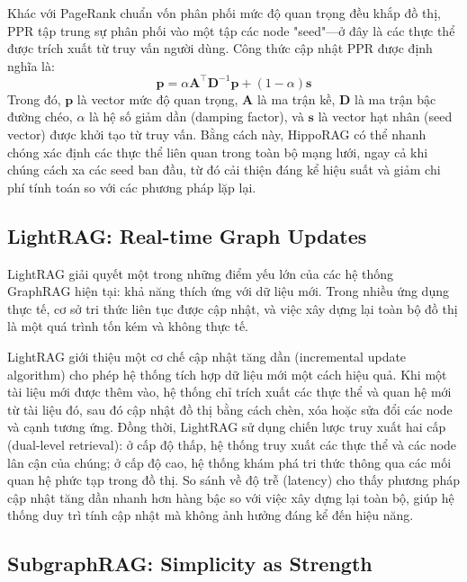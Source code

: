 Khác với PageRank chuẩn vốn phân phối mức độ quan trọng đều khắp đồ thị, PPR tập trung sự phân phối vào một tập các node "seed"—ở đây là các thực thể được trích xuất từ truy vấn người dùng. Công thức cập nhật PPR được định nghĩa là:
\begin{equation}
\mathbf{p} = \alpha \mathbf{A}^\top \mathbf{D}^{-1} \mathbf{p} + (1 - \alpha) \mathbf{s}
\label{eq:hipporag_ppr}
\end{equation}
Trong đó, $\mathbf{p}$ là vector mức độ quan trọng, $\mathbf{A}$ là ma trận kề, $\mathbf{D}$ là ma trận bậc đường chéo, $\alpha$ là hệ số giảm dần (damping factor), và $\mathbf{s}$ là vector hạt nhân (seed vector) được khởi tạo từ truy vấn. Bằng cách này, HippoRAG có thể nhanh chóng xác định các thực thể liên quan trong toàn bộ mạng lưới, ngay cả khi chúng cách xa các seed ban đầu, từ đó cải thiện đáng kể hiệu suất và giảm chi phí tính toán so với các phương pháp lặp lại.

\subsection{LightRAG: Real-time Graph Updates}
\label{subsec:lightrag}

LightRAG \cite{guo2024lightrag} giải quyết một trong những điểm yếu lớn của các hệ thống GraphRAG hiện tại: khả năng thích ứng với dữ liệu mới. Trong nhiều ứng dụng thực tế, cơ sở tri thức liên tục được cập nhật, và việc xây dựng lại toàn bộ đồ thị là một quá trình tốn kém và không thực tế.

LightRAG giới thiệu một cơ chế cập nhật tăng dần (incremental update algorithm) cho phép hệ thống tích hợp dữ liệu mới một cách hiệu quả. Khi một tài liệu mới được thêm vào, hệ thống chỉ trích xuất các thực thể và quan hệ mới từ tài liệu đó, sau đó cập nhật đồ thị bằng cách chèn, xóa hoặc sửa đổi các node và cạnh tương ứng. Đồng thời, LightRAG sử dụng chiến lược truy xuất hai cấp (dual-level retrieval): ở cấp độ thấp, hệ thống truy xuất các thực thể và các node lân cận của chúng; ở cấp độ cao, hệ thống khám phá tri thức thông qua các mối quan hệ phức tạp trong đồ thị. So sánh về độ trễ (latency) cho thấy phương pháp cập nhật tăng dần nhanh hơn hàng bậc so với việc xây dựng lại toàn bộ, giúp hệ thống duy trì tính cập nhật mà không ảnh hưởng đáng kể đến hiệu năng.

\subsection{SubgraphRAG: Simplicity as Strength}
\label{subsec:subgraphrag}

